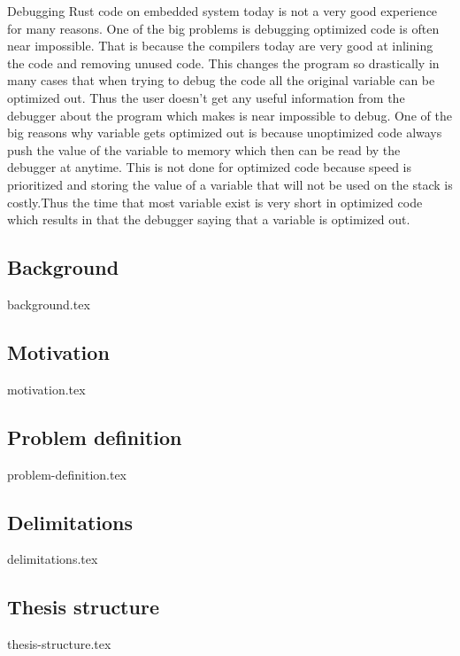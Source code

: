 
Debugging Rust code on embedded system today is not a very good experience for many reasons.
One of the big problems is debugging optimized code is often near impossible.
That is because the compilers today are very good at inlining the code and removing unused code.
This changes the program so drastically in many cases that when trying to debug the code all the original variable can be optimized out.
Thus the user doesn't get any useful information from the debugger about the program which makes is near impossible to debug.
One of the big reasons why variable gets optimized out is because unoptimized code always push the value of the variable to memory which then can be read by the debugger at anytime.
This is not done for optimized code because speed is prioritized and storing the value of a variable that will not be used on the stack is costly.Thus the time that most variable exist is very short in optimized code which results in that the debugger saying that a variable is optimized out.

\subsection{Background}
{background.tex}

\subsection{Motivation}
{motivation.tex}

\subsection{Problem definition}
\label{sec:problemdefinition}
{problem-definition.tex}



\subsection{Delimitations}
{delimitations.tex}

\subsection{Thesis structure}
{thesis-structure.tex}

